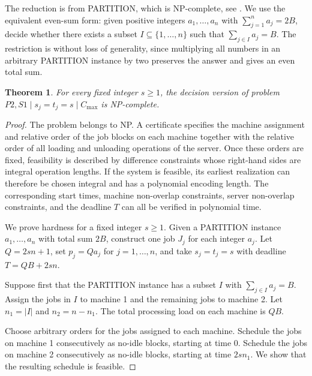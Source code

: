 \documentclass[11pt]{article}
\newtheorem{theorem}{Theorem}
\begin{document}
The reduction is from PARTITION, which is NP-complete, see 
\cite{garey_johnson_1979}. We use the equivalent even-sum form: given positive
integers \(a_1,\ldots,a_n\) with \(\sum_{j=1}^n a_j=2B\), decide whether there exists a subset \(I\subseteq\{1,\ldots,n\}\) such that \(\sum_{j\in I}a_j=B\).
The restriction is without loss of generality, since multiplying all numbers in an
arbitrary PARTITION instance by two preserves the answer and gives an even total
sum.

\begin{theorem}
\label{thm:ordinary_np_complete_equal_s}
For every fixed integer \(s\ge1\), the decision version of problem  \(P2,S1\mid s_j=t_j=s\mid C_{\max}\)
is NP-complete.
\end{theorem}

\begin{proof}
The problem belongs to NP. A certificate specifies the machine assignment and
relative order of the job blocks on each machine together with the relative order of
all loading and unloading operations of the server. Once these orders are fixed,
feasibility is described by difference constraints whose right-hand sides are
integral operation lengths. If the system is feasible, its earliest realization can
therefore be chosen integral and has a polynomial encoding length. The corresponding
start times, machine non-overlap constraints, server non-overlap constraints, and
the deadline \(T\) can all be verified in polynomial time.

We prove hardness for a fixed integer \(s\ge1\). Given a PARTITION instance
\(a_1,\ldots,a_n\) with total sum \(2B\), construct one job \(J_j\) for each
integer \(a_j\). Let \(Q=2sn+1\), set \(p_j=Qa_j\) for \(j=1,\ldots,n\), and take \(s_j=t_j=s\) with deadline \(T=QB+2sn\).

Suppose first that the PARTITION instance has a subset \(I\) with \(\sum_{j\in I}a_j=B\).
Assign the jobs in \(I\) to machine 1 and the remaining jobs to machine 2. Let \(n_1=|I|\) and \(n_2=n-n_1\).
The total processing load on each machine is \(QB\).

Choose arbitrary orders for the jobs assigned to each machine. Schedule the jobs on
machine 1 consecutively as no-idle blocks, starting at time \(0\). Schedule the jobs on machine 2 consecutively as no-idle blocks, starting at time \(2sn_1\).
We show that the resulting schedule is feasible.


\end{proof}
\end{document}
